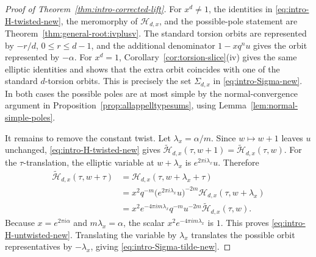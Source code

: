 \documentclass[12pt]{amsart}
\numberwithin{equation}{section}
\begin{document}
\begin{proof}[Proof of Theorem~\ref{thm:intro-corrected-lift}]
For \(x^d\neq1\), the identities in \eqref{eq:intro-H-twisted-new}, the
meromorphy of \(\mathcal H_{d,x}\), and the possible-pole statement are
Theorem~\ref{thm:general-root:ivplusv}.  The standard torsion orbits
are represented by \(-r/d\), \(0\le r\le d-1\), and the additional denominator
\(1-xq^n u\) gives the orbit represented by \(-\alpha\).  For \(x^d=1\),
Corollary~\ref{cor:torsion-slice}\textnormal{(iv)} gives the same elliptic
identities and shows that the extra orbit coincides with one of the standard
\(d\)-torsion orbits.  This is precisely the set \(\Sigma_{d,x}\) in
\eqref{eq:intro-Sigma-new}.  In both cases the possible poles are at most
simple by the normal-convergence argument in
Proposition~\ref{prop:allappelltypesums}, using
Lemma~\ref{lem:normal-simple-poles}.

It remains to remove the constant twist.  Let \(\lambda_x=\alpha/m\).  Since
\(w\mapsto w+1\) leaves \(u\) unchanged, \eqref{eq:intro-H-twisted-new} gives
\(\widetilde{\mathcal H}_{d,x}(\tau,w+1)=\widetilde{\mathcal H}_{d,x}(\tau,w)\).
For the \(\tau\)-translation, the elliptic variable at \(w+\lambda_x\) is
\(e^{2\pi i\lambda_x}u\).  Therefore
\[
\begin{aligned}
\widetilde{\mathcal H}_{d,x}(\tau,w+\tau)
&=\mathcal H_{d,x}(\tau,w+\lambda_x+\tau)\\
&=x^2q^{-m}\bigl(e^{2\pi i\lambda_x}u\bigr)^{-2m}
  \mathcal H_{d,x}(\tau,w+\lambda_x)\\
&=x^2e^{-4\pi i m\lambda_x}q^{-m}u^{-2m}
  \widetilde{\mathcal H}_{d,x}(\tau,w).
\end{aligned}
\]
Because \(x=e^{2\pi i\alpha}\) and \(m\lambda_x=\alpha\), the scalar
\(x^2e^{-4\pi i m\lambda_x}\) is \(1\).  This proves
\eqref{eq:intro-H-untwisted-new}.  Translating the variable by \(\lambda_x\)
translates the possible orbit representatives by \(-\lambda_x\), giving
\eqref{eq:intro-Sigma-tilde-new}.
\end{proof}
\end{document}
